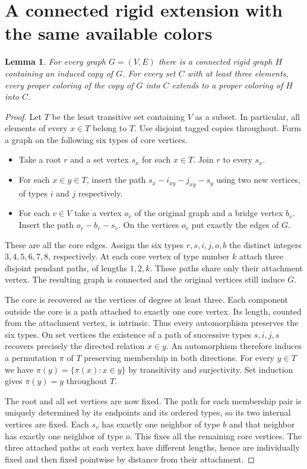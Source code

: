 \documentclass[11pt]{article}
\newtheorem{lemma}[theorem]{Lemma}
\begin{document}
\section*{A connected rigid extension with the same available colors}

\begin{lemma}\label{ext}
For every graph $G=(V,E)$ there is a connected rigid graph $H$ containing an induced copy of $G$. For every set $C$ with at least three elements, every proper coloring of the copy of $G$ into $C$ extends to a proper coloring of $H$ into $C$.
\end{lemma}
\begin{proof}
Let $T$ be the least transitive set containing $V$ as a subset. In particular, all elements of every $x\in T$ belong to $T$. Use disjoint tagged copies throughout. Form a graph on the following six types of core vertices.
\begin{itemize}
\item Take a root $r$ and a set vertex $s_x$ for each $x\in T$. Join $r$ to every $s_x$.
\item For each $x\in y\in T$, insert the path $s_x-i_{xy}-j_{xy}-s_y$ using two new vertices, of types $i$ and $j$ respectively.
\item For each $v\in V$ take a vertex $o_v$ of the original graph and a bridge vertex $b_v$. Insert the path $o_v-b_v-s_v$. On the vertices $o_v$ put exactly the edges of $G$.
\end{itemize}
These are all the core edges. Assign the six types $r,s,i,j,o,b$ the distinct integers $3,4,5,6,7,8$, respectively. At each core vertex of type number $k$ attach three disjoint pendant paths, of lengths $1,2,k$. These paths share only their attachment vertex. The resulting graph is connected and the original vertices still induce $G$.

The core is recovered as the vertices of degree at least three. Each component outside the core is a path attached to exactly one core vertex. Its length, counted from the attachment vertex, is intrinsic. Thus every automorphism preserves the six types. On set vertices the existence of a path of successive types $s,i,j,s$ recovers precisely the directed relation $x\in y$. An automorphism therefore induces a permutation $\pi$ of $T$ preserving membership in both directions. For every $y\in T$ we have $\pi(y)=\{\pi(x):x\in y\}$ by transitivity and surjectivity. Set induction gives $\pi(y)=y$ throughout $T$.

The root and all set vertices are now fixed. The path for each membership pair is uniquely determined by its endpoints and its ordered types, so its two internal vertices are fixed. Each $s_v$ has exactly one neighbor of type $b$ and that neighbor has exactly one neighbor of type $o$. This fixes all the remaining core vertices. The three attached paths at each vertex have different lengths, hence are individually fixed and then fixed pointwise by distance from their attachment.


\end{proof}
\end{document}
